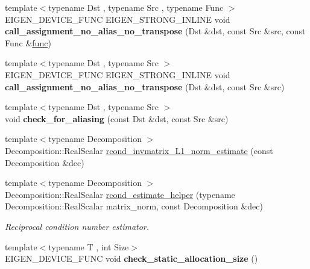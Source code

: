 \begin{DoxyCompactItemize}
{\footnotesize template$<$typename Dst , typename Src , typename Func $>$ }\\E\+I\+G\+E\+N\+\_\+\+D\+E\+V\+I\+C\+E\+\_\+\+F\+U\+NC E\+I\+G\+E\+N\+\_\+\+S\+T\+R\+O\+N\+G\+\_\+\+I\+N\+L\+I\+NE void {\bfseries call\+\_\+assignment\+\_\+no\+\_\+alias\+\_\+no\+\_\+transpose} (Dst \&dst, const Src \&src, const Func \&\hyperlink{structfunc}{func})
\item 
\mbox{\label{namespace_eigen_1_1internal_a29a5ab3dff368b97b02bc85877353d27}} 
{\footnotesize template$<$typename Dst , typename Src $>$ }\\E\+I\+G\+E\+N\+\_\+\+D\+E\+V\+I\+C\+E\+\_\+\+F\+U\+NC E\+I\+G\+E\+N\+\_\+\+S\+T\+R\+O\+N\+G\+\_\+\+I\+N\+L\+I\+NE void {\bfseries call\+\_\+assignment\+\_\+no\+\_\+alias\+\_\+no\+\_\+transpose} (Dst \&dst, const Src \&src)
\item 
\mbox{\label{namespace_eigen_1_1internal_a2088791fb8428a2cfad6bd71298795a2}} 
{\footnotesize template$<$typename Dst , typename Src $>$ }\\void {\bfseries check\+\_\+for\+\_\+aliasing} (const Dst \&dst, const Src \&src)
\item 
{\footnotesize template$<$typename Decomposition $>$ }\\Decomposition\+::\+Real\+Scalar \hyperlink{namespace_eigen_1_1internal_aa3f5b3cfa34df750994a247d4823aa51}{rcond\+\_\+invmatrix\+\_\+\+L1\+\_\+norm\+\_\+estimate} (const Decomposition \&dec)
\item 
{\footnotesize template$<$typename Decomposition $>$ }\\Decomposition\+::\+Real\+Scalar \hyperlink{namespace_eigen_1_1internal_ad1de0d785387bfb5435c410bf0554068}{rcond\+\_\+estimate\+\_\+helper} (typename Decomposition\+::\+Real\+Scalar matrix\+\_\+norm, const Decomposition \&dec)
\begin{DoxyCompactList}\small\item\em Reciprocal condition number estimator. \end{DoxyCompactList}\item 
\mbox{\label{namespace_eigen_1_1internal_a0f7142ecdc385ba5e9dcf80f996c2e25}} 
{\footnotesize template$<$typename T , int Size$>$ }\\E\+I\+G\+E\+N\+\_\+\+D\+E\+V\+I\+C\+E\+\_\+\+F\+U\+NC void {\bfseries check\+\_\+static\+\_\+allocation\+\_\+size} ()

\end{DoxyCompactItemize}
